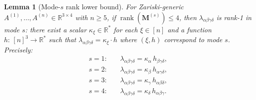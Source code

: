 \documentclass[12pt]{article}
\newtheorem{lemma}[theorem]{Lemma}
\theoremstyle{definition}
\DeclareMathOperator{\rank}{rank}
\newcommand{\bR}{\mathbb{R}}
\begin{document}
\begin{lemma}[Mode-$s$ rank lower bound]\label{lem:rank-lb-mode}
For Zariski-generic $A^{(1)},\ldots,A^{(n)}\in\bR^{3\times4}$ with $n\geq 5$, if
$\rank(\mathbf{M}^{(s)})\leq 4$, then $\lambda_{\alpha\beta\gamma\delta}$ is rank-1 in mode $s$:
there exist a scalar $\kappa_\xi\in\bR^*$ for each $\xi\in[n]$ and a function
$h:\,[n]^3\to\bR^*$ such that $\lambda_{\alpha\beta\gamma\delta}=\kappa_\xi \cdot h$ where
$(\xi,h)$ correspond to mode $s$.  Precisely:
\begin{align*}
  s=1: &\quad \lambda_{\alpha\beta\gamma\delta} = \kappa_\alpha\,h_{\beta\gamma\delta}, \\
  s=2: &\quad \lambda_{\alpha\beta\gamma\delta} = \kappa_\beta\,h_{\alpha\gamma\delta}, \\
  s=3: &\quad \lambda_{\alpha\beta\gamma\delta} = \kappa_\gamma\,h_{\alpha\beta\delta}, \\
  s=4: &\quad \lambda_{\alpha\beta\gamma\delta} = \kappa_\delta\,h_{\alpha\beta\gamma}.
\end{align*}
\end{lemma}
\end{document}
